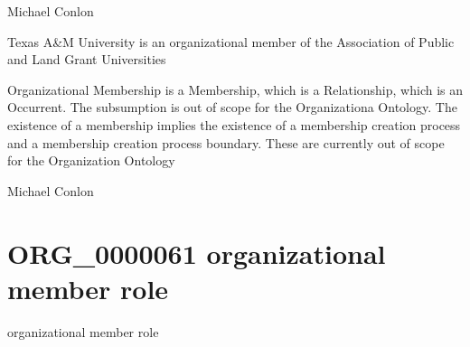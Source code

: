 \documentclass[letterpaper,10pt,english]{sphinxmanual}
\begin{document}
\begin{sphinxShadowBox}

\sphinxAtStartPar
Michael Conlon 
\end{sphinxShadowBox}

\begin{sphinxShadowBox}

\sphinxAtStartPar
Texas A\&M University is an organizational member of the Association of Public and Land Grant Universities
\end{sphinxShadowBox}

\begin{sphinxShadowBox}

\sphinxAtStartPar
Organizational Membership is a Membership, which is a Relationship, which is an Occurrent.  The subsumption is out of scope for the Organizationa Ontology. The existence of a membership implies the existence of a membership creation process and a membership creation process boundary.  These are currently out of scope for the Organization Ontology
\end{sphinxShadowBox}

\begin{sphinxShadowBox}

\sphinxAtStartPar
Michael Conlon 
\end{sphinxShadowBox}
\begin{quote}
\label{\detokenize{doc-ORG_0000061:org-0000061}}\label{\detokenize{doc-ORG_0000061:organizational-member-role}}\label{\detokenize{doc-ORG_0000061:org-0000061}}
\ignorespaces \end{quote}


\section{ORG\_0000061 \sphinxhyphen{} organizational member role}
\label{\detokenize{doc-ORG_0000061:org-0000061-organizational-member-role}}\label{\detokenize{doc-ORG_0000061:index-0}}\label{\detokenize{doc-ORG_0000061::doc}}
\begin{sphinxShadowBox}

\sphinxAtStartPar
organizational member role
\end{sphinxShadowBox}
\end{document}
